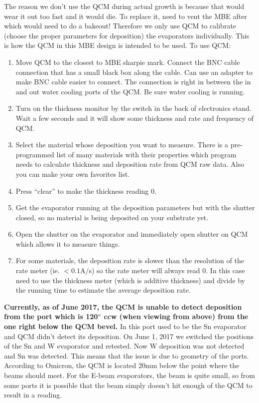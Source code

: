 The reason we don’t use the QCM during actual growth is because that would wear it out too fast and it would die. To replace it, need to vent the MBE after which would need to do a bakeout! Therefore we only use QCM to calibrate (choose the proper parameters for deposition) the evaporators individually. This is how the QCM in this MBE design is intended to be used.
To use QCM:
\begin{enumerate}
\item	Move QCM to the closest to MBE sharpie mark. Connect the BNC cable connection that has a small black box along the cable. Can use an adapter to make BNC cable easier to connect. The connection is right in between the in and out water cooling ports of the QCM. Be sure water cooling is running.
\item	Turn on the thickness monitor by the switch in the back of electronics stand. Wait a few seconds and it will show some thickness and rate and frequency of QCM. 
\item	Select the material whose deposition you want to measure. There is a pre-programmed list of many materials with their properties which program needs to calculate thickness and deposition rate from QCM raw data. Also you can make your own favorites list.
\item	Press “clear” to make the thickness reading 0.
\item	Get the evaporator running at the deposition parameters but with the shutter closed, so no material is being deposited on your substrate yet. 
\item	Open the shutter on the evaporator and immediately open shutter on QCM which allows it to measure things.
\item	For some materials, the deposition rate is slower than the resolution of the rate meter (ie. $<0.1$A/s) so the rate meter will always read 0. In this case need to use the thickness meter (which is additive thickness) and divide by the running time to estimate the average deposition rate.
\end{enumerate}

\textbf{Currently, as of June 2017, the QCM is unable to detect deposition from the port which is 120$\degree$ ccw (when viewing from above) from the one right below the QCM bevel.} In this port used to be the Sn evaporator and QCM didn't detect its deposition. On June 1, 2017 we switched the positions of the Sn and W evaporator and retested. Now W deposition was not detected and Sn was detected. This means that the issue is due to geometry of the ports. According to Omicron, the QCM is located 20mm below the point where the beams should meet. For the E-beam evaporators, the beam is quite small, so from some ports it is possible that the beam simply doesn't hit enough of the QCM to result in a reading.


